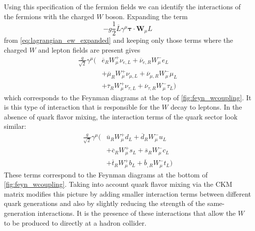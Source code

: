 Using this specification of the fermion fields 
we can identify the interactions of the fermions with the 
charged $W$ boson.  Expanding the term 
\begin{equation}
-g \frac{1}{2} \overline{L}\gamma^{\mu}\boldsymbol{\tau} \cdot \textbf{W}_{\mu} L 
\end{equation}
from \eqn\eqref{eq:lagrangian_ew_expanded}
and keeping only those
terms where the charged $W$ and lepton fields are present gives
\begin{equation}
\begin{aligned}
\frac{g}{\sqrt{2}}\gamma^{\mu}\Big( &
\overline{e}_R W_{\mu}^+ \nu_{e,L} +
\overline{\nu}_{e,R} W^-_{\mu} e_L \\&+
\overline{\mu}_R W_{\mu}^+ \nu_{\mu,L} +
\overline{\nu}_{\mu,R} W^-_{\mu} \mu_L \\&+
\overline{\tau}_R W_{\mu}^+ \nu_{\tau,L} +
\overline{\nu}_{\tau,R} W^-_{\mu} \tau_L \Big)
\end{aligned}
\label{eq:couplings_wleptons}
\end{equation}
which corresponds to the Feynman diagrams at the top
of \fig\ref{fig:feyn_wcoupling}. It is this
type of interaction that is responsible for the $W$ decay to leptons.
In the absence of quark flavor mixing, the interaction terms 
of the quark sector look similar:
\begin{equation}
\begin{aligned}
\frac{g}{\sqrt{2}}\gamma^{\mu}\Big( &
\overline{u}_R W_{\mu}^+ d_{L} +
\overline{d}_{R} W^-_{\mu} u_L \\&+
\overline{c}_R W_{\mu}^+ s_{L} +
\overline{s}_{R} W^-_{\mu} c_L \\&+
\overline{t}_R W_{\mu}^+ b_{L} +
\overline{b}_{,R} W^-_{\mu} t_L \Big)
\end{aligned}
\end{equation}
These terms correspond to the Feynman diagrams at the bottom
of \fig\ref{fig:feyn_wcoupling}.
Taking into account quark flavor mixing via the CKM matrix
modifies this picture by adding smaller interaction
terms between different quark generations and also by slightly reducing
the strength of the same-generation interactions.
It is the presence of these interactions that allow the $W$ 
to be produced to directly at a hadron collider.


